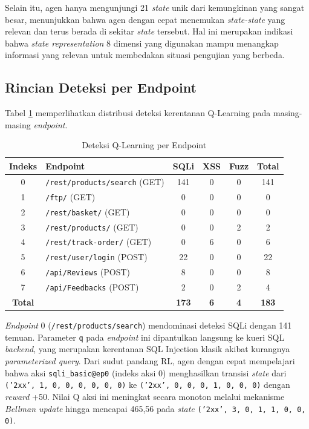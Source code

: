 Selain itu, agen hanya mengunjungi 21 \textit{state} unik dari kemungkinan yang sangat besar, menunjukkan bahwa agen dengan cepat menemukan \textit{state-state} yang relevan dan terus berada di sekitar \textit{state} tersebut. Hal ini merupakan indikasi bahwa \textit{state representation} 8 dimensi yang digunakan mampu menangkap informasi yang relevan untuk membedakan situasi pengujian yang berbeda.

\subsection{Rincian Deteksi per Endpoint}

Tabel \ref{tab:ql_per_endpoint} memperlihatkan distribusi deteksi kerentanan Q-Learning pada masing-masing \textit{endpoint}.

\begin{table}[H]
\centering
\caption{Deteksi Q-Learning per Endpoint}
\label{tab:ql_per_endpoint}
\begin{tabular}{|c|l|c|c|c|c|}
\hline
\textbf{Indeks} & \textbf{Endpoint} & \textbf{SQLi} & \textbf{XSS} & \textbf{Fuzz} & \textbf{Total} \\
\hline
0 & \texttt{/rest/products/search} (GET) & 141 & 0 & 0 & 141 \\
1 & \texttt{/ftp/} (GET) & 0 & 0 & 0 & 0 \\
2 & \texttt{/rest/basket/} (GET) & 0 & 0 & 0 & 0 \\
3 & \texttt{/rest/products/} (GET) & 0 & 0 & 2 & 2 \\
4 & \texttt{/rest/track-order/} (GET) & 0 & 6 & 0 & 6 \\
5 & \texttt{/rest/user/login} (POST) & 22 & 0 & 0 & 22 \\
6 & \texttt{/api/Reviews} (POST) & 8 & 0 & 0 & 8 \\
7 & \texttt{/api/Feedbacks} (POST) & 2 & 0 & 2 & 4 \\
\hline
\textbf{Total} & & \textbf{173} & \textbf{6} & \textbf{4} & \textbf{183} \\
\hline
\end{tabular}
\end{table}

\textit{Endpoint} 0 (\texttt{/rest/products/search}) mendominasi deteksi SQLi dengan 141 temuan. Parameter \texttt{q} pada \textit{endpoint} ini dipantulkan langsung ke kueri SQL \textit{backend}, yang merupakan kerentanan SQL Injection klasik akibat kurangnya \textit{parameterized query}. Dari sudut pandang RL, agen dengan cepat mempelajari bahwa aksi \texttt{sqli\_basic@ep0} (indeks aksi 0) menghasilkan transisi \textit{state} dari \texttt{('2xx', 1, 0, 0, 0, 0, 0, 0)} ke \texttt{('2xx', 0, 0, 0, 1, 0, 0, 0)} dengan \textit{reward} +50. Nilai Q aksi ini meningkat secara monoton melalui mekanisme \textit{Bellman update} hingga mencapai 465,56 pada \textit{state} \texttt{('2xx', 3, 0, 1, 1, 0, 0, 0)}.

